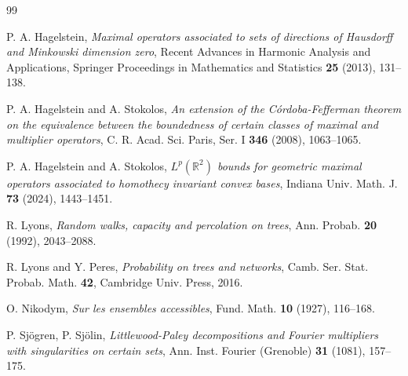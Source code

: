 \documentclass[12pt]{amsart}
\numberwithin{equation}{section}
\theoremstyle{definition}
\theoremstyle{remark}
\begin{document}
\begin{thebibliography}{99}












P. A. Hagelstein, \emph{Maximal operators associated to sets of directions of Hausdorff and Minkowski dimension zero}, Recent Advances in Harmonic Analysis and Applications, Springer Proceedings in Mathematics and Statistics  {\bf{25}} (2013), 131--138.

P. A. Hagelstein and A. Stokolos,  \emph{An extension of the
C\'ordoba-Fefferman theorem on the equivalence between the
boundedness of certain classes of maximal and multiplier
operators}, C. R. Acad. Sci. Paris, Ser. I {\bf{346}} (2008), 1063--1065.


P. A. Hagelstein and A. Stokolos, \emph{$L^p(\mathbb{R}^2)$ bounds for geometric maximal operators associated to homothecy invariant convex bases}, Indiana Univ. Math. J. {\bf{73}} (2024), 1443--1451.




 R. Lyons, \emph{Random walks, capacity and percolation on trees}, Ann. Probab. {\bf{20}} (1992), 2043--2088.

 R. Lyons and Y. Peres, \emph{Probability on trees and networks}, Camb. Ser. Stat. Probab. Math. {\bf{42}}, Cambridge Univ. Press, 2016.


O. Nikodym, \emph{Sur les ensembles accessibles}, Fund. Math. {\bf{10}} (1927), 116--168.






 P. Sj\"ogren, P. Sj\"olin, \emph{Littlewood-Paley decompositions and Fourier multipliers with singularities on certain sets}, Ann. Inst. Fourier (Grenoble) {\bf{31}} (1081), 157--175.











\end{thebibliography}
\end{document}
